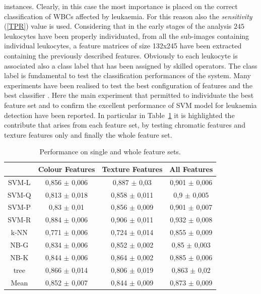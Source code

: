 \documentclass[final,a4paper,12pt,english]{UnicaPhdThesis3}
\begin{document}
instances. Clearly, in this case the most importance is placed on the correct classification of WBCs affected by leukaemia. For this reason also the \textit{sensitivity} (\ref{TPR}) value is used. Considering that in the early stages of the analysis $245$ leukocytes have been properly individuated, from all the sub-images containing individual leukocytes, a feature matrices of size 132x245 have been extracted containing the previously described features. Obviously to each leukocyte is associated also a class label that has been assigned by skilled operators. The class label is fundamental to test the classification performances of the system. Many experiments have been realised to test the best configuration of features and the best classifier \cite{Put13b, Put13c, Put14b}. Here the main experiment that permitted to individuate the best feature set and to confirm the excellent performance of SVM model for leukaemia detection have been reported. In particular in Table~\ref{tab:table3} it is highlighted the contribute that arises from each feature set, by testing chromatic features and texture features only and finally the whole feature set.
	
	\begin{table}[!t]
		\centering\tabcolsep=2mm
		\begin{tabular}{cccc}
			\hline
			\hspace{2 mm}	 &   Colour Features 		& Texture Features    			& All Features 			\\
			\hline
			SVM-L		&  	      	0,856 $\pm$ 0,006						&        	0,887 $\pm$ 0,03            					&        	0,901 $\pm$ 0,006            			\\
			SVM-Q	 	&      	0,813 $\pm$  0,018						&       	0,858 $\pm$  0,011 						&       	0,9	 $\pm$  0,005 					\\
			SVM-P		&	  	0,83 $\pm$ 0,01							&       	0,856 $\pm$ 0,009 						&       	0,901 $\pm$ 0,007 					\\
			SVM-R 		&		0,884 $\pm$ 0,006						&        	0,906 $\pm$ 0,011 	     					&        	0,932 $\pm$ 0,008 	     				\\
			k-NN  		& 		0,771 $\pm$ 0,006						&     	0,724 $\pm$ 0,014 						&     	0,855 $\pm$ 0,009 					\\
			NB-G  		& 	   	0,834 $\pm$ 0,006						&        	0,852 $\pm$ 0,002 						&        	0,85  $\pm$ 0,003 					\\
			NB-K 		& 		0,844 $\pm$ 0,006 						&       	0,864 $\pm$ 0,002 						&       	0,885 $\pm$ 0,006 					\\
			tree  		&	    	0,866 $\pm$ 0,014						&        	0,806 $\pm$ 0,019 						&        	0,863 $\pm$ 0,02 					\\
			\hline
			Mean 	  	 &	  	0,852 $\pm$ 0,007						&        	0,844 $\pm$ 0,009						&        	0,873 $\pm$ 0,009					\\
			\hline
		\end{tabular}
		\caption{Performance on single and whole feature sets.}
		\label{tab:table3}
	\end{table}
	
\end{document}

